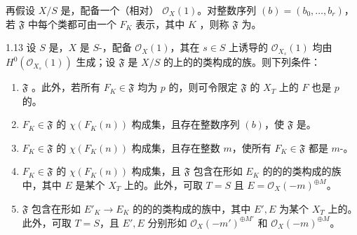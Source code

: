 再假设 $X/S$ 是，配备一个（相对） $\mathcal O_X(1)$。对整数序列 $(b)=(b_0,\ldots,b_r)$，若 $\mathfrak F$ 中每个类都可由一个 $F_K$ 表示，其中 $K$ ，则称 $\mathfrak F$ 为。
\begin{SGAresult}{}{1.13}
设 $S$ 是，$X$ 是 $S$-，配备 $\mathcal O_X(1)$，其在 $s\in S$ 上诱导的 $\mathcal O_{X_s}(1)$ 均由 $H^0(\mathcal O_{X_s}(1))$ 生成；设 $\mathfrak F$ 是 $X/S$ 的上的的类构成的族。则下列条件：
\begin{enumerate}
\item[(i)] $\mathfrak F$ 。此外，若所有 $F_K\in\mathfrak F$ 均为 $p$ 的，则可令限定 $\mathfrak F$ 的 $X_T$ 上的 $F$ 也是 $p$ 的。
\item[(ii)] $F_K\in\mathfrak F$ 的 $\chi(F_K(n))$ 构成集，且存在整数序列 $(b)$，使 $\mathfrak F$ 是。
\item[(iii)] $F_K\in\mathfrak F$ 的 $\chi(F_K(n))$ 构成集，且存在整数 $m$，使所有 $F_K\in\mathfrak F$ 都是 $m$-。
\item[(iv)] $F_K\in\mathfrak F$ 的 $\chi(F_K(n))$ 构成集，且 $\mathfrak F$ 包含在形如 $E_K$ 的的的类构成的族中，其中 $E$ 是某个 $X_T$ 上的。此外，可取 $T=S$ 且 $E=\mathcal O_X(-m)^{\oplus M}$。
\item[(v)] $\mathfrak F$ 包含在形如 $E'_K\to E_K$ 的的的类构成的族中，其中 $E',E$ 为某个 $X_T$ 上的。此外，可取 $T=S$，且 $E',E$ 分别形如 $\mathcal O_X(-m')^{\oplus M'}$ 和 $\mathcal O_X(-m)^{\oplus M}$。
\end{enumerate}
\end{SGAresult}
